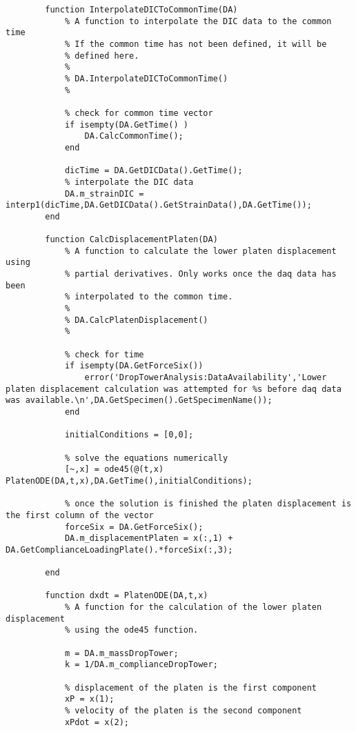 \begin{lstlisting}
        function InterpolateDICToCommonTime(DA)
            % A function to interpolate the DIC data to the common time
            % If the common time has not been defined, it will be
            % defined here.
            %
            % DA.InterpolateDICToCommonTime()
            %
            
            % check for common time vector
            if isempty(DA.GetTime() )
                DA.CalcCommonTime();
            end
            
            dicTime = DA.GetDICData().GetTime();
            % interpolate the DIC data
            DA.m_strainDIC = interp1(dicTime,DA.GetDICData().GetStrainData(),DA.GetTime());
        end
        
        function CalcDisplacementPlaten(DA)
            % A function to calculate the lower platen displacement using
            % partial derivatives. Only works once the daq data has been
            % interpolated to the common time.
            %
            % DA.CalcPlatenDisplacement()
            %
            
            % check for time
            if isempty(DA.GetForceSix())
                error('DropTowerAnalysis:DataAvailability','Lower platen displacement calculation was attempted for %s before daq data was available.\n',DA.GetSpecimen().GetSpecimenName());
            end
            
            initialConditions = [0,0];
            
            % solve the equations numerically
            [~,x] = ode45(@(t,x) PlatenODE(DA,t,x),DA.GetTime(),initialConditions);
            
            % once the solution is finished the platen displacement is the first column of the vector
            forceSix = DA.GetForceSix();
            DA.m_displacementPlaten = x(:,1) + DA.GetComplianceLoadingPlate().*forceSix(:,3);
            
        end
        
        function dxdt = PlatenODE(DA,t,x)
            % A function for the calculation of the lower platen displacement
            % using the ode45 function.
            
            m = DA.m_massDropTower;
            k = 1/DA.m_complianceDropTower;
            
            % displacement of the platen is the first component
            xP = x(1);
            % velocity of the platen is the second component
            xPdot = x(2);
            

\end{lstlisting}
